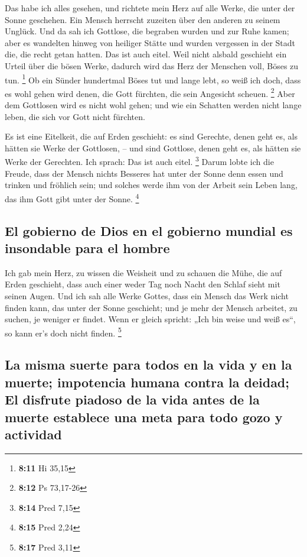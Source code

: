  Das habe ich alles gesehen, und richtete mein Herz auf
alle Werke, die unter der Sonne geschehen. Ein Mensch herrscht zuzeiten
über den anderen zu seinem Unglück.  Und da sah ich
Gottlose, die begraben wurden und zur Ruhe kamen; aber es wandelten
hinweg von heiliger Stätte und wurden vergessen in der Stadt die, die
recht getan hatten. Das ist auch eitel.  Weil nicht
alsbald geschieht ein Urteil über die bösen Werke, dadurch wird das Herz
der Menschen voll, Böses zu tun. \footnote{\textbf{8:11} Hi 35,15}
 Ob ein Sünder hundertmal Böses tut und lange lebt, so
weiß ich doch, dass es wohl gehen wird denen, die Gott fürchten, die
sein Angesicht scheuen. \footnote{\textbf{8:12} Ps 73,17-26}
 Aber dem Gottlosen wird es nicht wohl gehen; und wie ein
Schatten werden nicht lange leben, die sich vor Gott nicht fürchten.

 Es ist eine Eitelkeit, die auf Erden geschieht: es sind
Gerechte, denen geht es, als hätten sie Werke der Gottlosen, -- und sind
Gottlose, denen geht es, als hätten sie Werke der Gerechten. Ich sprach:
Das ist auch eitel. \footnote{\textbf{8:14} Pred 7,15} 
Darum lobte ich die Freude, dass der Mensch nichts Besseres hat unter
der Sonne denn essen und trinken und fröhlich sein; und solches werde
ihm von der Arbeit sein Leben lang, das ihm Gott gibt unter der Sonne.
\footnote{\textbf{8:15} Pred 2,24}

\hypertarget{el-gobierno-de-dios-en-el-gobierno-mundial-es-insondable-para-el-hombre}{%
\subsection{El gobierno de Dios en el gobierno mundial es insondable
para el
hombre}\label{el-gobierno-de-dios-en-el-gobierno-mundial-es-insondable-para-el-hombre}}

 Ich gab mein Herz, zu wissen die Weisheit und zu schauen
die Mühe, die auf Erden geschieht, dass auch einer weder Tag noch Nacht
den Schlaf sieht mit seinen Augen.  Und ich sah alle
Werke Gottes, dass ein Mensch das Werk nicht finden kann, das unter der
Sonne geschieht; und je mehr der Mensch arbeitet, zu suchen, je weniger
er findet. Wenn er gleich spricht: „Ich bin weise und weiß es``, so kann
er's doch nicht finden. \footnote{\textbf{8:17} Pred 3,11}

\hypertarget{la-misma-suerte-para-todos-en-la-vida-y-en-la-muerte-impotencia-humana-contra-la-deidad-el-disfrute-piadoso-de-la-vida-antes-de-la-muerte-establece-una-meta-para-todo-gozo-y-actividad}{%
\subsection{La misma suerte para todos en la vida y en la muerte;
impotencia humana contra la deidad; El disfrute piadoso de la vida antes
de la muerte establece una meta para todo gozo y
actividad}\label{la-misma-suerte-para-todos-en-la-vida-y-en-la-muerte-impotencia-humana-contra-la-deidad-el-disfrute-piadoso-de-la-vida-antes-de-la-muerte-establece-una-meta-para-todo-gozo-y-actividad}}


